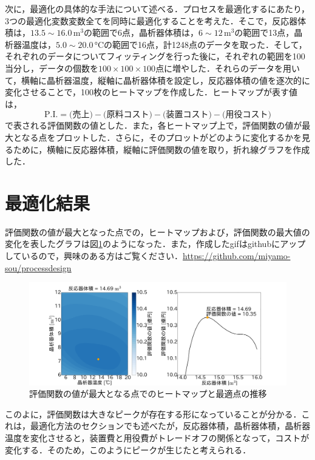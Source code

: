 \documentclass[a4j]{jsreport}
\begin{document}
次に，最適化の具体的な手法について述べる．プロセスを最適化するにあたり，3つの最適化変数変数全てを同時に最適化することを考えた．そこで，反応器体積は，$13.5 \sim 16.0 \, \si{\cubic \metre}$の範囲で6点，晶析器体積は，$6 \sim 12 \, \si{\cubic \metre}$の範囲で13点，晶析器温度は，$5.0 \sim 20.0 \, \si{\degreeCelsius}$の範囲で16点，計1248点のデータを取った．そして，それぞれのデータについてフィッティングを行った後に，それぞれの範囲を100当分し，データの個数を$100 \times 100 \times 100$点に増やした．それらのデータを用いて，横軸に晶析器温度，縦軸に晶析器体積を設定し，反応器体積の値を逐次的に変化させることで，100枚のヒートマップを作成した．ヒートマップが表す値は，
\begin{equation}
  \text{P.I.} = \text{(売上)} - \text{(原料コスト)} - \text{(装置コスト)} -\text{(用役コスト)}
\end{equation}
で表される評価関数の値とした．また，各ヒートマップ上で，評価関数の値が最大となる点をプロットした．さらに，そのプロットがどのように変化するかを見るために，横軸に反応器体積，縦軸に評価関数の値を取り，折れ線グラフを作成した．

\section{最適化結果}
評価関数の値が最大となった点での，ヒートマップおよび，評価関数の最大値の変化を表したグラフは図\ref{最適化結果}のようになった．また，作成したgifはgithubにアップしているので，興味のある方はご覧ください．\url{https://github.com/miyamo-sou/processdesign}
\begin{figure}[htbp]
    \label{最適化結果}
    \begin{center}
        \includegraphics[scale=0.1]{snapshot.png}
        \caption{評価関数の値が最大となる点でのヒートマップと最適点の推移}
    \end{center}
\end{figure}

このよに，評価関数は大きなピークが存在する形になっていることが分かる．これは，最適化方法のセクションでも述べたが，反応器体積，晶析器体積，晶析器温度を変化させると，装置費と用役費がトレードオフの関係となって，コストが変化する．そのため，このようにピークが生じたと考えられる．
\end{document}
